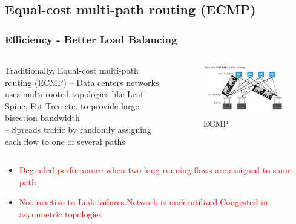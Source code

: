 \documentclass{beamer}
\begin{document}
\subsection{Equal-cost multi-path routing (ECMP)}
\begin{frame}
	\frametitle{Efficiency - Better Load Balancing}
	\begin{columns}[T] %
		\begin{column}[T]{7cm} 
			\begin{block}{Traditionally, Equal-cost multi-path routing (ECMP)}
			-- Data centers networks uses multi-rooted topologies like Leaf-Spine, Fat-Tree etc. to provide large bisection bandwidth \\
			-- Spreads traffic by randomly assigning each flow to one of several paths
			\end{block}
		\end{column}
		\begin{column}[T]{5cm} 
			\begin{figure}
				\includegraphics[scale=0.25]{4}
				\caption{ECMP}
			\end{figure}
		\end{column}
	\end{columns}
	\medskip
	\begin{itemize}
	\item\textcolor{red}{Degraded performance when two long-running flows are assigned to same path} \\
	\item\textcolor{red}{Not reactive to Link failures.Network is underutilized.Congested in asymmetric topologies}
\end{itemize}
\end{frame}
\end{document}

